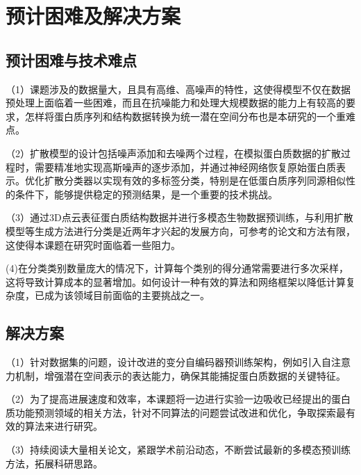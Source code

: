 
\chapter{预计困难及解决方案}

\section{预计困难与技术难点}
（1）课题涉及的数据量大，且具有高维、高噪声的特性，这使得模型不仅在数据预处理上面临着一些困难，而且在抗噪能力和处理大规模数据的能力上有较高的要求，怎样将蛋白质序列和结构数据转换为统一潜在空间分布也是本研究的一个重难点。

（2）扩散模型的设计包括噪声添加和去噪两个过程，在模拟蛋白质数据的扩散过程时，需要精准地实现高斯噪声的逐步添加，并通过神经网络恢复原始蛋白质表示。优化扩散分类器以实现有效的多标签分类，特别是在低蛋白质序列同源相似性的条件下，能够提供稳定的预测结果，是一个重要的技术挑战。

（3）通过3D点云表征蛋白质结构数据并进行多模态生物数据预训练，与利用扩散模型等生成方法进行分类是近两年才兴起的发展方向，可参考的论文和方法有限，这使得本课题在研究时面临着一些阻力。

(4)在分类类别数量庞大的情况下，计算每个类别的得分通常需要进行多次采样，这将导致计算成本的显著增加。如何设计一种有效的算法和网络框架以降低计算复杂度，已成为该领域目前面临的主要挑战之一。

\section{解决方案}

（1）针对数据集的问题，设计改进的变分自编码器预训练架构，例如引入自注意力机制，增强潜在空间表示的表达能力，确保其能捕捉蛋白质数据的关键特征。

（2）为了提高进展速度和效率，本课题将一边进行实验一边吸收已经提出的蛋白质功能预测领域的相关方法，针对不同算法的问题尝试改进和优化，争取探索最有效的算法来进行研究。

（3）持续阅读大量相关论文，紧跟学术前沿动态，不断尝试最新的多模态预训练方法，拓展科研思路。

